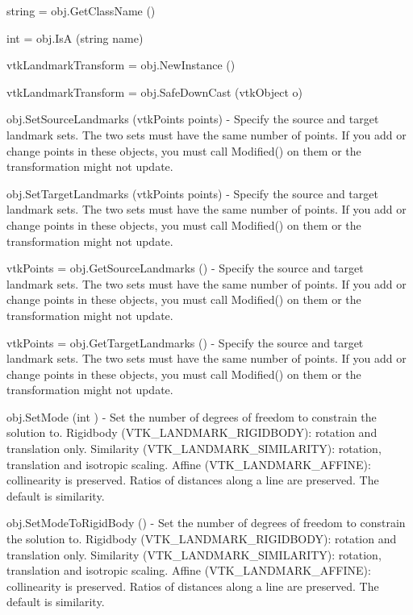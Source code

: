 \begin{DoxyItemize}
\item {\ttfamily string = obj.\-Get\-Class\-Name ()}  
\item {\ttfamily int = obj.\-Is\-A (string name)}  
\item {\ttfamily vtk\-Landmark\-Transform = obj.\-New\-Instance ()}  
\item {\ttfamily vtk\-Landmark\-Transform = obj.\-Safe\-Down\-Cast (vtk\-Object o)}  
\item {\ttfamily obj.\-Set\-Source\-Landmarks (vtk\-Points points)} -\/ Specify the source and target landmark sets. The two sets must have the same number of points. If you add or change points in these objects, you must call Modified() on them or the transformation might not update.  
\item {\ttfamily obj.\-Set\-Target\-Landmarks (vtk\-Points points)} -\/ Specify the source and target landmark sets. The two sets must have the same number of points. If you add or change points in these objects, you must call Modified() on them or the transformation might not update.  
\item {\ttfamily vtk\-Points = obj.\-Get\-Source\-Landmarks ()} -\/ Specify the source and target landmark sets. The two sets must have the same number of points. If you add or change points in these objects, you must call Modified() on them or the transformation might not update.  
\item {\ttfamily vtk\-Points = obj.\-Get\-Target\-Landmarks ()} -\/ Specify the source and target landmark sets. The two sets must have the same number of points. If you add or change points in these objects, you must call Modified() on them or the transformation might not update.  
\item {\ttfamily obj.\-Set\-Mode (int )} -\/ Set the number of degrees of freedom to constrain the solution to. Rigidbody (V\-T\-K\-\_\-\-L\-A\-N\-D\-M\-A\-R\-K\-\_\-\-R\-I\-G\-I\-D\-B\-O\-D\-Y)\-: rotation and translation only. Similarity (V\-T\-K\-\_\-\-L\-A\-N\-D\-M\-A\-R\-K\-\_\-\-S\-I\-M\-I\-L\-A\-R\-I\-T\-Y)\-: rotation, translation and isotropic scaling. Affine (V\-T\-K\-\_\-\-L\-A\-N\-D\-M\-A\-R\-K\-\_\-\-A\-F\-F\-I\-N\-E)\-: collinearity is preserved. Ratios of distances along a line are preserved. The default is similarity.  
\item {\ttfamily obj.\-Set\-Mode\-To\-Rigid\-Body ()} -\/ Set the number of degrees of freedom to constrain the solution to. Rigidbody (V\-T\-K\-\_\-\-L\-A\-N\-D\-M\-A\-R\-K\-\_\-\-R\-I\-G\-I\-D\-B\-O\-D\-Y)\-: rotation and translation only. Similarity (V\-T\-K\-\_\-\-L\-A\-N\-D\-M\-A\-R\-K\-\_\-\-S\-I\-M\-I\-L\-A\-R\-I\-T\-Y)\-: rotation, translation and isotropic scaling. Affine (V\-T\-K\-\_\-\-L\-A\-N\-D\-M\-A\-R\-K\-\_\-\-A\-F\-F\-I\-N\-E)\-: collinearity is preserved. Ratios of distances along a line are preserved. The default is similarity.  

\end{DoxyItemize}
